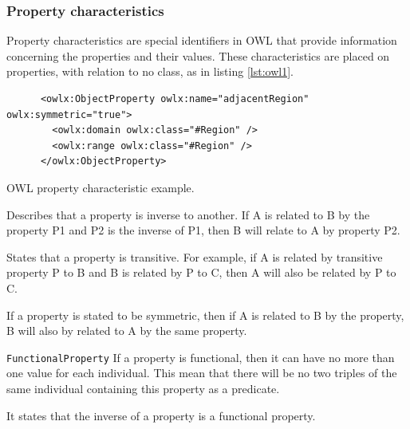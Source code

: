 \subsubsection*{Property characteristics}

Property characteristics are special identifiers in OWL that provide information concerning the properties and their values. These characteristics are placed on properties, with relation to no class, as in listing \ref{lst:owl1}.


\begin{listing}[ht]\centering
  \begin{minipage}{.8\textwidth}
    \begin{verbatim}
      <owlx:ObjectProperty owlx:name="adjacentRegion" owlx:symmetric="true">
        <owlx:domain owlx:class="#Region" /> 
        <owlx:range owlx:class="#Region" />
      </owlx:ObjectProperty>
    \end{verbatim}
  \end{minipage}
  \caption{OWL property characteristic example.}\label{lst:owl1}
\end{listing}


\begin{description}
\item[\texttt{inverseOf}] Describes that a property is inverse to another. If A is related to B by the property P1 and P2 is the inverse of P1, then B will relate to A by property P2.

\item[\texttt{TransitiveProperty}] States that a property is transitive. For example, if A is related by transitive property P to B and B is related by P to C, then A will also be related by P to C.

\item[\texttt{SymmetrycProperty}] If a property is stated to be symmetric, then if A is related to B by the property, B will also by related to A by the same property.

\item{\texttt{FunctionalProperty}} If a property is functional, then it can have no more than one value for each individual. This mean that there will be no two triples of the same individual containing this property as a predicate.

\item[\texttt{InverseFunctionalProperty}] It states that the inverse of a property is a functional property.
\end{description}

